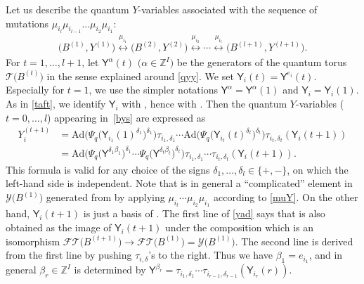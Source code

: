 \documentclass[pdftex]{sigma}
\newcommand{\Z}{{\mathbb Z}}
\newcommand\rY{{\mathsf{Y}}}
\newcommand\Ad{{\mathrm{Ad}}}
\newcommand\bY{Y}
\numberwithin{equation}{section}
\begin{document}
Let us describe the quantum $Y$-variables associated with the sequence
of mutations $\mu_{i_l} \mu_{i_{l-1}} \dots \allowbreak\mu_{i_2} \mu_{i_1}$:
 \begin{align}\label{bys}
\bigl(B^{(1)},\bY^{(1)}\bigr) \stackrel{\mu_{i_1}}{\longleftrightarrow}
\bigl(B^{(2)},\bY^{(2)}\bigr) \stackrel{\mu_{i_2}}{\longleftrightarrow}
\cdots
\stackrel{\mu_{i_l}}{\longleftrightarrow} \bigl(B^{(l+1)},\bY^{(l+1)}\bigr).
\end{align}
%
For $t=1, \dots, l+1$, let $\rY^\alpha(t)$ $\bigl(\alpha \in \Z^I\bigr)$ be the
generators of the quantum torus $\mathcal{T}\bigl(B^{(t)}\bigr)$ in the sense
explained around \eqref{qyy}. We set $\rY_i(t) =
\rY^{e_i}(t)$.
Especially for $t=1$, we use the simpler notations
$\rY^\alpha=\rY^\alpha(1)$ and $\rY_i=\rY_i(1)$. As in \eqref{taft},
we identify $\rY_i$ with , hence
 with .
%
Then the quantum $Y$-variables 
($t=0, \dots, l$) appearing in~\eqref{bys} are expressed as
\begin{align}
Y_i^{(t+1)}
&= \Ad\bigl(\Psi_{q}\bigl(\rY_{i_1}(1)^{\delta_1}\bigr)^{\delta_1}\bigr) \tau_{i_1,\delta_1}\dotsm \Ad\bigl(\Psi_{q}\bigl(\rY_{i_{t}}(t)^{\delta_{t}}\bigr)^{\delta_{t}}\bigr) \tau_{i_{t},\delta_{t}}(\rY_i(t+1))\nonumber
\\
&=\Ad\bigl(\Psi_{q}\bigl(\rY^{\delta_1 \beta_1}\bigr)^{\delta_1} \dotsm \Psi_{q}\bigl(\rY^{\delta_{t} \beta_{t}}\bigr)^{\delta_{t}}\bigr) \tau_{i_1,\delta_1}\dotsm \tau_{i_{t},\delta_{t}}(\rY_i(t+1)).\label{yad}
\end{align}
This formula is valid for any choice of the signs $\delta_1, \dots,
\delta_l \in \{+, -\}$, on which the left-hand side is independent. Note that
 is in general a ``complicated'' element in
$\mathcal{Y}\bigl(B^{(1)}\bigr)$ generated from  by applying
$\mu_{i_t}\dotsm \mu_{i_2}\mu_{i_1}$ according to \eqref{muY}.
On the other hand,
$\rY_i(t+1)$ is just a basis of . The first
line of \eqref{yad} says that  is also obtained as the
image of $\rY_i(t+1)$ under the composition
 which is an
isomorphism
$\mathcal{FT}\bigl(B^{(t+1)}\bigr) \rightarrow \mathcal{FT}\bigl(B^{(1)}\bigr) =
\mathcal{Y}\bigl(B^{(1)}\bigr)$. The second line is derived from the first line
by pushing $\tau_{i,\delta}$'s to the right. Thus we have $\beta_1 = e_{i_1}$,
and in general $\beta_r \in \Z^I$ is determined by
$\rY^{\beta_r} = \tau_{i_1,\delta_1} \dotsm \tau_{i_{r-1},
 \delta_{r-1}}(\rY_{i_r}(r))$.
\end{document}
